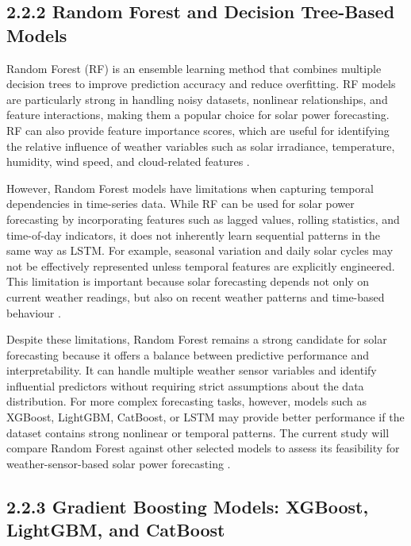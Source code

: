\subsection{2.2.2 Random Forest and Decision Tree-Based Models}

Random Forest (RF) is an ensemble learning method that combines multiple decision trees to improve prediction accuracy and reduce overfitting. RF models are particularly strong in handling noisy datasets, nonlinear relationships, and feature interactions, making them a popular choice for solar power forecasting. RF can also provide feature importance scores, which are useful for identifying the relative influence of weather variables such as solar irradiance, temperature, humidity, wind speed, and cloud-related features \parencite{JnanaVarshitha2025, Bakht2025, Alhassan2025, Pongphaw2025}.

However, Random Forest models have limitations when capturing temporal dependencies in time-series data. While RF can be used for solar power forecasting by incorporating features such as lagged values, rolling statistics, and time-of-day indicators, it does not inherently learn sequential patterns in the same way as LSTM. For example, seasonal variation and daily solar cycles may not be effectively represented unless temporal features are explicitly engineered. This limitation is important because solar forecasting depends not only on current weather readings, but also on recent weather patterns and time-based behaviour \parencite{Eren2025, TsaiLo2025, CarvalhoJunior2025}.

Despite these limitations, Random Forest remains a strong candidate for solar forecasting because it offers a balance between predictive performance and interpretability. It can handle multiple weather sensor variables and identify influential predictors without requiring strict assumptions about the data distribution. For more complex forecasting tasks, however, models such as XGBoost, LightGBM, CatBoost, or LSTM may provide better performance if the dataset contains strong nonlinear or temporal patterns. The current study will compare Random Forest against other selected models to assess its feasibility for weather-sensor-based solar power forecasting \parencite{JnanaVarshitha2025, Bakht2025, Pongphaw2025, Alhassan2025}.

\subsection{2.2.3 Gradient Boosting Models: XGBoost, LightGBM, and CatBoost}

